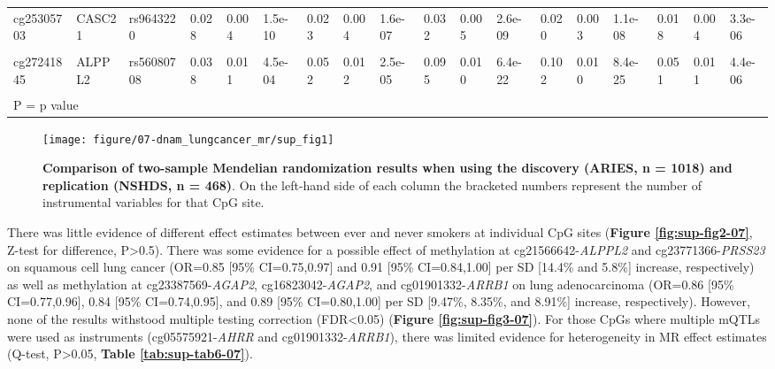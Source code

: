 \documentclass[11pt,twoside]{bristolthesis}
\begin{document}
\begin{landscape}
\begin{table}[!h]
{\begin{tabular}[t]{llllllllllllllllll}
cg25305703 & CASC21 & rs9643220 & 0.028 & 0.004 & 1.5e-10 & 0.023 & 0.004 & 1.6e-07 & 0.032 & 0.005 & 2.6e-09 & 0.020 & 0.003 & 1.1e-08 & 0.018 & 0.004 & 3.3e-06\\
\cellcolor{gray!6}{cg26963277} & \cellcolor{gray!6}{KCNQ1} & \cellcolor{gray!6}{rs463924} & \cellcolor{gray!6}{-0.018} & \cellcolor{gray!6}{0.002} & \cellcolor{gray!6}{1.6e-14} & \cellcolor{gray!6}{-0.015} & \cellcolor{gray!6}{0.003} & \cellcolor{gray!6}{1.2e-08} & \cellcolor{gray!6}{-0.008} & \cellcolor{gray!6}{0.003} & \cellcolor{gray!6}{5.6e-03} & \cellcolor{gray!6}{-0.012} & \cellcolor{gray!6}{0.002} & \cellcolor{gray!6}{6.3e-09} & \cellcolor{gray!6}{-0.015} & \cellcolor{gray!6}{0.002} & \cellcolor{gray!6}{7.5e-12}\\
\addlinespace
cg27241845 & ALPPL2 & rs56080708 & 0.038 & 0.011 & 4.5e-04 & 0.052 & 0.012 & 2.5e-05 & 0.095 & 0.010 & 6.4e-22 & 0.102 & 0.010 & 8.4e-25 & 0.051 & 0.011 & 4.4e-06\\
\bottomrule
\multicolumn{18}{l}{\textsuperscript{} P = p value}\\
\end{tabular}}
\end{table}
\end{landscape}



\begin{figure}

{\centering \texttt{[image: figure/07-dnam\_lungcancer\_mr/sup\_fig1]} 

}

\caption[Comparison of two-sample Mendelian randomization results when using the discovery (ARIES, n = 1018) and replication (NSHDS, n = 468)]{\textbf{Comparison of two-sample Mendelian randomization results when using the discovery (ARIES, n = 1018) and replication (NSHDS, n = 468)}. On the left-hand side of each column the bracketed numbers represent the number of instrumental variables for that CpG site.}\label{fig:sup-fig1-07}
\end{figure}
There was little evidence of different effect estimates between ever and never smokers at individual CpG sites (\textbf{Figure \ref{fig:sup-fig2-07}}, Z-test for difference, P\textgreater0.5). There was some evidence for a possible effect of methylation at cg21566642-\emph{ALPPL2} and cg23771366-\emph{PRSS23} on squamous cell lung cancer (OR=0.85 {[}95\% CI=0.75,0.97{]} and 0.91 {[}95\% CI=0.84,1.00{]} per SD {[}14.4\% and 5.8\%{]} increase, respectively) as well as methylation at cg23387569-\emph{AGAP2}, cg16823042-\emph{AGAP2}, and cg01901332-\emph{ARRB1} on lung adenocarcinoma (OR=0.86 {[}95\% CI=0.77,0.96{]}, 0.84 {[}95\% CI=0.74,0.95{]}, and 0.89 {[}95\% CI=0.80,1.00{]} per SD {[}9.47\%, 8.35\%, and 8.91\%{]} increase, respectively). However, none of the results withstood multiple testing correction (FDR\textless0.05) (\textbf{Figure \ref{fig:sup-fig3-07}}). For those CpGs where multiple mQTLs were used as instruments (cg05575921-\emph{AHRR} and cg01901332-\emph{ARRB1}), there was limited evidence for heterogeneity in MR effect estimates (Q-test, P\textgreater0.05, \textbf{Table \ref{tab:sup-tab6-07}}).
\end{document}
